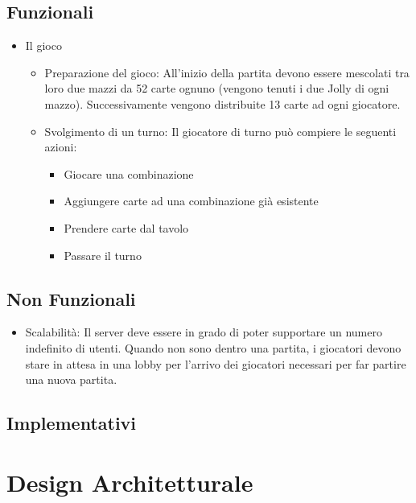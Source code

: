\documentclass[a4paper,10pt]{article}
\begin{document}
    \subsection{Funzionali}
    \begin{itemize}
        \item Il gioco
        \begin{itemize}
            \item Preparazione del gioco:\newline
            All'inizio della partita devono essere mescolati tra loro due mazzi da 52 carte ognuno (vengono tenuti
            i due Jolly di ogni mazzo).
            Successivamente vengono distribuite 13 carte ad ogni giocatore.
            \item Svolgimento di un turno:\newline
            Il giocatore di turno può compiere le seguenti azioni:
            \begin{itemize}
                \item Giocare una combinazione
                \item Aggiungere carte ad una combinazione già esistente
                \item Prendere carte dal tavolo
                \item Passare il turno
            \end{itemize}
        \end{itemize}
    \end{itemize}

    \subsection{Non Funzionali}
    \begin{itemize}
        \item Scalabilità: Il server deve essere in grado di poter supportare un numero indefinito di utenti.
        Quando
        non sono dentro una partita, i giocatori devono stare in attesa in una lobby per l'arrivo dei giocatori
        necessari per far partire una nuova partita.
    \end{itemize}

    \subsection{Implementativi}

    \newpage


    \section{Design Architetturale}
\end{document}
